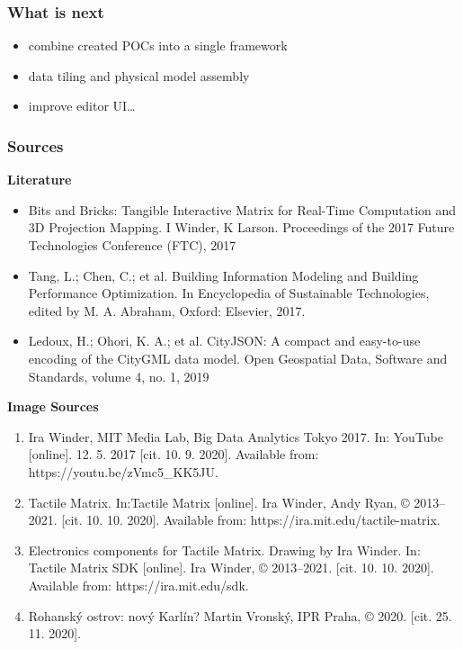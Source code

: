 \documentclass[czech,xcolor={table}]{beamer}
\begin{document}
	\begin{frame}
		\frametitle{What is next}
		\begin{itemize}
			\item combine created POCs into a single framework
			\item data tiling and physical model assembly
			\item improve editor UI\ldots
		\end{itemize}
	\end{frame}


	\begin{frame}
		\frametitle{Sources}
		\tiny
		\textbf{Literature}
		\begin{itemize}
			\item Bits and Bricks: Tangible Interactive Matrix for Real-Time Computation and 3D Projection Mapping. I Winder, K Larson. Proceedings of the 2017 Future Technologies Conference (FTC), 2017
			\item Tang, L.; Chen, C.; et al. Building Information Modeling and Building Performance Optimization. In Encyclopedia of Sustainable Technologies, edited by M. A. Abraham, Oxford: Elsevier, 2017.
			\item Ledoux, H.; Ohori, K. A.; et al. CityJSON: A compact and easy-to-use encoding of the CityGML data model. Open Geospatial Data, Software and Standards, volume 4, no. 1, 2019
		\end{itemize}
		\textbf{Image Sources}
		\begin{enumerate}
			\item Ira Winder, MIT Media Lab, Big Data Analytics Tokyo 2017. In: YouTube [online]. 12. 5. 2017 [cit. 10. 9. 2020]. Available from: https://youtu.be/zVmc5\_KK5JU.	
			\item Tactile Matrix. In:Tactile Matrix [online]. Ira Winder, Andy Ryan, © 2013–2021. [cit. 10. 10. 2020]. Available from: https://ira.mit.edu/tactile-matrix. 
			\item Electronics components for Tactile Matrix. Drawing by Ira Winder. In: Tactile Matrix SDK [online]. Ira Winder, © 2013–2021. [cit. 10. 10. 2020]. Available from: https://ira.mit.edu/sdk.
			\item Rohanský ostrov: nový Karlín? Martin Vronský, IPR Praha, © 2020. [cit. 25. 11. 2020].	
		\end{enumerate}
	\end{frame}
	
\end{document}
